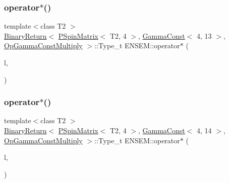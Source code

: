 \subsubsection{\texorpdfstring{operator$\ast$()}{operator*()}\hspace{0.1cm}{\footnotesize\ttfamily [30/64]}}
{\footnotesize\ttfamily template$<$class T2 $>$ \\
\mbox{\hyperlink{structENSEM_1_1BinaryReturn}{Binary\+Return}}$<$ \mbox{\hyperlink{classENSEM_1_1PSpinMatrix}{P\+Spin\+Matrix}}$<$ T2, 4 $>$, \mbox{\hyperlink{classENSEM_1_1GammaConst}{Gamma\+Const}}$<$ 4, 13 $>$, \mbox{\hyperlink{structENSEM_1_1OpGammaConstMultiply}{Op\+Gamma\+Const\+Multiply}} $>$\+::Type\+\_\+t E\+N\+S\+E\+M\+::operator$\ast$ (\begin{DoxyParamCaption}\item[{const \mbox{\hyperlink{classENSEM_1_1PSpinMatrix}{P\+Spin\+Matrix}}$<$ T2, 4 $>$ \&}]{l,  }\item[{const \mbox{\hyperlink{classENSEM_1_1GammaConst}{Gamma\+Const}}$<$ 4, 13 $>$ \&}]{ }\end{DoxyParamCaption})\hspace{0.3cm}{\ttfamily [inline]}}

\mbox{\label{group__primspinmatrix_ga45919c652c2dae5905f239b2f35eb67c}} 
\subsubsection{\texorpdfstring{operator$\ast$()}{operator*()}\hspace{0.1cm}{\footnotesize\ttfamily [31/64]}}
{\footnotesize\ttfamily template$<$class T2 $>$ \\
\mbox{\hyperlink{structENSEM_1_1BinaryReturn}{Binary\+Return}}$<$ \mbox{\hyperlink{classENSEM_1_1PSpinMatrix}{P\+Spin\+Matrix}}$<$ T2, 4 $>$, \mbox{\hyperlink{classENSEM_1_1GammaConst}{Gamma\+Const}}$<$ 4, 14 $>$, \mbox{\hyperlink{structENSEM_1_1OpGammaConstMultiply}{Op\+Gamma\+Const\+Multiply}} $>$\+::Type\+\_\+t E\+N\+S\+E\+M\+::operator$\ast$ (\begin{DoxyParamCaption}\item[{const \mbox{\hyperlink{classENSEM_1_1PSpinMatrix}{P\+Spin\+Matrix}}$<$ T2, 4 $>$ \&}]{l,  }\item[{const \mbox{\hyperlink{classENSEM_1_1GammaConst}{Gamma\+Const}}$<$ 4, 14 $>$ \&}]{ }\end{DoxyParamCaption})\hspace{0.3cm}{\ttfamily [inline]}}

